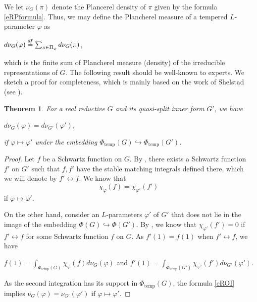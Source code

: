 \documentclass[11pt]{article}
\theoremstyle{plain}
\newtheorem{theorem}{Theorem}[section]
\theoremstyle{remark}
\theoremstyle{definition}
\DeclareMathOperator{\tp}{temp}
\begin{document}
We let $\nu_G(\pi)$ denote the Plancerel density of $\pi$ given by the formula \eqref{eRPformula}.
Thus, we may define the Plancherel measure of a tempered $L$-parameter $\varphi$ as
\begin{center}
    $d\nu_{G}(\varphi)\stackrel{\rm df}{=}\sum_{\pi\in \Pi_{\varphi}}d\nu_{G}(\pi)$,
\end{center}
which is the finite sum of Plancherel measure (density) of the irreducible representations of $G$. 
The following result should be well-known to experts. 
We sketch a proof for completeness, which is mainly based on the work of Shelstad (see \cite{Shelstad1979char,ShelstadLindis}).  

 


\begin{theorem}\label{tshelsinn}
For a real reductive $G$ and its quasi-split inner form $G'$, we have
\begin{center}
    $d\nu_{G}(\varphi)=d\nu_{G'}(\varphi')$,  
\end{center}
if $\varphi\mapsto \varphi'$ under the embedding $\Phi_{\tp}(G)\hookrightarrow \Phi_{\tp}(G')$. 
\end{theorem}
\begin{proof}
Let $f$ be a Schwartz function on $G$. 
By \cite[Theorem 4.1]{Shelstad1979char}, there exists a Schwartz function $f'$ on $G'$ such that $f,f'$ have the stable matching integrals defined there, which we will denote by $f'\leftrightarrow f$. 
We know that
\begin{equation}\label{eROI}
    \chi_{\varphi}(f)=\chi_{\varphi'}(f')
\end{equation}
if $\varphi\mapsto \varphi'$. 

On the other hand, consider an $L$-parameters $\varphi'$ of $G'$ that does not lie in the image of the embedding $\Phi(G)\hookrightarrow \Phi(G')$.  
By \cite[Theorem 4.1.1]{ShelstadLindis}, we know that $\chi_{\varphi'}(f')=0$ if $f'\leftrightarrow f$ for some Schwartz function $f$ on $G$. 
As $f'(1)=f(1)$ when $f'\leftrightarrow f$, we have
\begin{center}
    $f(1)=\int_{\Phi_{\tp}(G)}\chi_{\varphi}(f)d\nu_G(\varphi)$ and $f'(1)=\int_{\Phi_{\tp}(G')}\chi_{\varphi'}(f')d\nu_{G'}(\varphi')$. 
\end{center}
As the second integration has its support in $\Phi_{\tp}(G)$, the formula \eqref{eROI}
implies $\nu_{G}(\varphi)=\nu_{G'}(\varphi')$ if $\varphi\mapsto \varphi'$. 
\end{proof}
\end{document}
